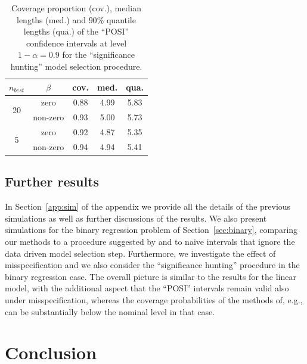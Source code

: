 \documentclass[preprint]{imsart}
\numberwithin{equation}{section}
\begin{document}
\begin{table}[tbp]
\begin{center}
\begin{tabular}{c|c|ccc}
$n_{best}$ & $\beta$ & cov. & med. & qua. \\ \hline
\multirow{2}{*}{20} & zero & 0.88 & 4.99 & 5.83  \\ \cline{2-5}
 & non-zero & 0.93 & 5.00 & 5.73  \\ \hline
\multirow{2}{*}{5} & zero &  0.92 & 4.87 & 5.35  \\ \cline{2-5}
 & non-zero & 0.94 & 4.94 & 5.41
\end{tabular}%
\end{center}
\caption{Coverage proportion (cov.), median lengths (med.) and $90 \%$ quantile lengths (qua.) of the ``POSI'' confidence intervals at level $1-\alpha=0.9$ for the ``significance hunting'' model selection procedure.}
\label{table:homolm:significance:hunting}
\end{table}


\subsection{Further results}


In Section~\ref{app:sim} of the appendix we provide all the details of the previous simulations as well as further discussions of the results. We also present simulations for the binary regression problem of Section~\ref{sec:binary}, comparing our methods to a procedure suggested by \cite{taylor17post} and to naive intervals that ignore the data driven model selection step. Furthermore, we investigate the effect of misspecification and we also consider the ``significance hunting'' procedure in the binary regression case. The overall picture is similar to the results for the linear model, with the additional aspect that the ``POSI'' intervals remain valid also under misspecification, whereas the coverage probabilities of the methods of, e.g., \cite{taylor17post} can be substantially below the nominal level in that case.



\section{Conclusion}\label{sec:concl}
\end{document}
